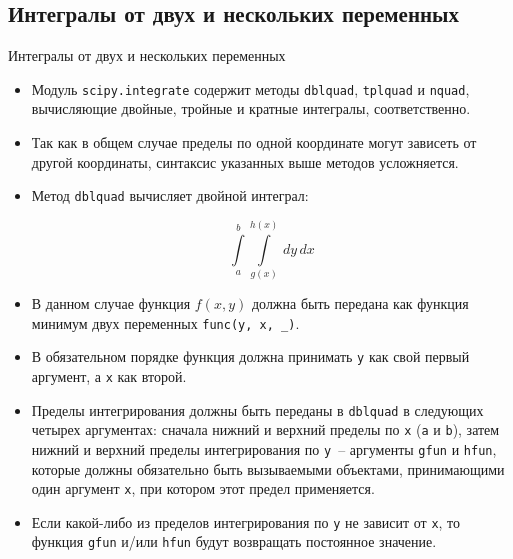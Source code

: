 \documentclass[aspectratio=169, mathserif]{beamer}	%
\begin{document}
\subsection{Интегралы от двух и нескольких переменных}
\begin{frame}[fragile]{Интегралы от двух и нескольких переменных}
\scriptsize
\begin{itemize}
	\item Модуль \texttt{scipy.integrate} содержит методы \texttt{dblquad}, \texttt{tplquad} и \texttt{nquad}, вычисляющие двойные, тройные и кратные интегралы, соответственно.
	\item Так как в общем случае пределы по одной координате могут зависеть от другой координаты, синтаксис указанных выше методов усложняется.
	\item Метод \texttt{dblquad} вычисляет двойной интеграл:
	
	$$\int\limits_{a}^{b}\int\limits_{g(x)}^{h(x)} \, dy \, dx$$
	
	\item В данном случае функция $f(x,y)$ должна быть передана как функция минимум двух переменных \texttt{func(y, x, \_)}. 
	\item В обязательном порядке функция должна принимать \texttt{y} как свой первый аргумент, а \texttt{x} как второй. 
	\item Пределы интегрирования должны быть переданы в \texttt{dblquad} в следующих четырех аргументах: сначала нижний и верхний пределы по \texttt{x} (\texttt{a} и \texttt{b}), затем нижний и верхний пределы интегрирования по \texttt{y}~-- аргументы \texttt{gfun} и \texttt{hfun}, которые должны обязательно быть вызываемыми объектами, принимающими один аргумент \texttt{x}, при котором этот предел применяется. 
	\item Если какой-либо из пределов интегрирования по \texttt{y} не зависит от \texttt{x}, то функция \texttt{gfun} и/или \texttt{hfun} будут возвращать постоянное значение.
\vfil
\end{itemize}
\end{frame}
\end{document}
